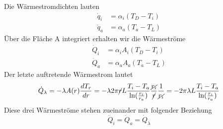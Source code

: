 Die Wärmestromdichten lauten
\begin{align*}
	\dot{q}_i &= \alpha_i (T_D - T_i) \\
	\dot{q}_a &= \alpha_a (T_a - T_L)
\end{align*}
Über die Fläche A integriert erhalten wir die Wärmeströme
\begin{align*}
	\dot{Q}_i &= \alpha_i A_i (T_D - T_i) \\
	\dot{Q}_a &= \alpha_a A_a (T_a - T_L)
\end{align*}
Der letzte auftretende Wärmestrom lautet
\begin{align*}
	\dot{Q}_\lambda = -\lambda A(r)\frac{dT_r}{dr} = -\lambda 2\pi \cancel{r}L \frac{T_i - T_a}{\ln(\frac{r_i}{r_a})} \frac{\cancel{r_i}}{\cancel{r}}\frac{1}{\cancel{r_i}} = -2\pi\lambda L\frac{T_i - T_a}{\ln(\frac{r_i}{r_a})}
\end{align*}
Diese drei Wärmeströme stehen zueinander mit folgender Beziehung
\[
	\dot{Q}_i = \dot{Q}_a = \dot{Q}_\lambda
\]